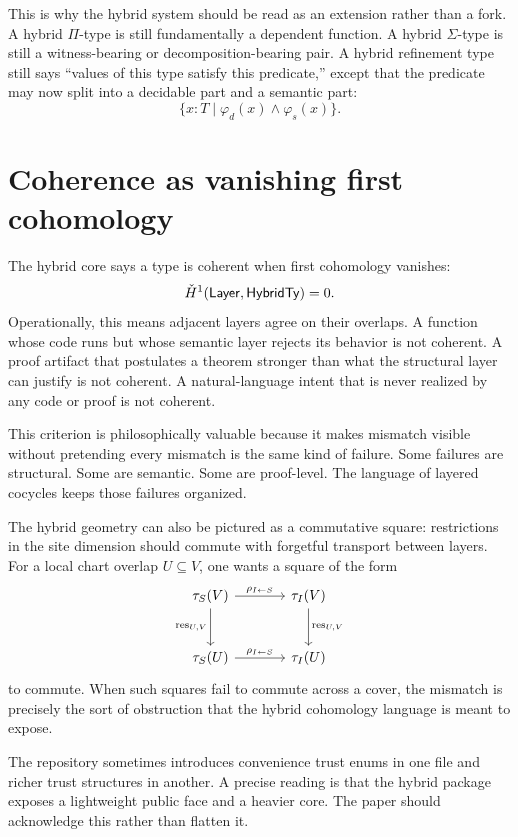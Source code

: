 This is why the hybrid system should be read as an extension rather than a fork. A hybrid
$\Pi$-type is still fundamentally a dependent function. A hybrid $\Sigma$-type is still a
witness-bearing or decomposition-bearing pair. A hybrid refinement type still says
``values of this type satisfy this predicate,'' except that the predicate may now split into
a decidable part and a semantic part:
\[
  \{x : T \mid \varphi_d(x) \land \varphi_s(x)\}.
\]

\section*{Coherence as vanishing first cohomology}
The hybrid core says a type is coherent when first cohomology vanishes:
\[
  \check{H}^{1}(\mathsf{Layer}, \mathsf{HybridTy}) = 0.
\]
Operationally, this means adjacent layers agree on their overlaps. A function whose code
runs but whose semantic layer rejects its behavior is not coherent. A proof artifact that
postulates a theorem stronger than what the structural layer can justify is not coherent.
A natural-language intent that is never realized by any code or proof is not coherent.

This criterion is philosophically valuable because it makes mismatch visible without
pretending every mismatch is the same kind of failure. Some failures are structural. Some
are semantic. Some are proof-level. The language of layered cocycles keeps those failures
organized.

The hybrid geometry can also be pictured as a commutative square: restrictions in the site
dimension should commute with forgetful transport between layers. For a local chart overlap
$U \subseteq V$, one wants a square of the form
\[
\begin{tikzcd}[column sep=large, row sep=large]
\tau_S(V) \arrow[r, "\rho_{I \leftarrow S}"] \arrow[d, "\mathrm{res}_{U,V}"'] &
\tau_I(V) \arrow[d, "\mathrm{res}_{U,V}"] \\
\tau_S(U) \arrow[r, "\rho_{I \leftarrow S}"] &
\tau_I(U)
\end{tikzcd}
\]
to commute. When such squares fail to commute across a cover, the mismatch is precisely
the sort of obstruction that the hybrid cohomology language is meant to expose.

\begin{remark}
The repository sometimes introduces convenience trust enums in one file and richer trust
structures in another. A precise reading is that the hybrid package exposes a lightweight
public face and a heavier core. The paper should acknowledge this rather than flatten it.
\end{remark}
